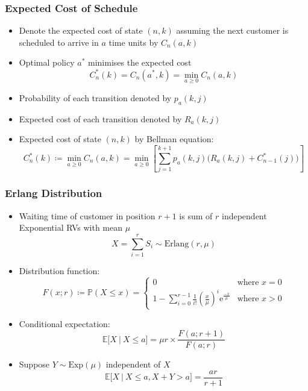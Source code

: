\documentclass{beamer}
\begin{document}
\begin{frame}
	\frametitle{Expected Cost of Schedule}

	\begin{itemize}
		\item Denote the expected cost of state $(n, k)$ assuming the next customer is scheduled to arrive in $a$ time units by $C_{n} (a, k)$
		\item Optimal policy $a^{*}$ minimises the expected cost
		\begin{equation*}
			C_{n}^{*} (k) = C_{n} (a^{*}, k) = \min_{a \geq 0} C_{n} (a, k)
		\end{equation*}
		\item Probability of each transition denoted by $p_{a} (k, j)$
		\item Expected cost of each transition denoted by $R_{a} (k, j)$
		\item Expected cost of state $(n, k)$ by \alert{Bellman equation}:
		\begin{equation*}
			C_{n}^{*} (k) \coloneqq \min_{a \geq 0} C_{n} (a, k) = \min_{a \geq 0} \left[ \sum_{j = 1}^{k + 1} p_{a} (k, j) \Big( R_{a} (k, j) + C_{n - 1}^{*} (j) \Big) \right]
		\end{equation*}
	\end{itemize}
\end{frame}

\begin{frame}
	\frametitle{Erlang Distribution}

	\begin{itemize}
		\item Waiting time of customer in position $r + 1$ is sum of $r$ independent Exponential RVs with mean $\mu$
		\begin{equation*}
		 	X = \sum_{i = 1}^{r} S_{i} \sim \text{Erlang} (r, \mu)
		\end{equation*}
		\item Distribution function:
		\begin{equation*}
			F (x; r) \coloneqq \mathbb{P} (X \leq x) = \begin{cases} 0 & \text{where $x = 0$} \\ 1 - \sum_{i = 0}^{r - 1} \frac{1}{i!} \left( \frac{x}{\mu} \right)^{i} \mathrm{e}^{\frac{-x}{\mu}} & \text{where $x > 0$} \end{cases}
		\end{equation*}
		\item Conditional expectation:
		\begin{equation*}
			\mathbb{E} \Big[ X \ \big| \ X \leq a \Big] = \mu r \times \frac{F (a; r + 1)}{F (a; r)}
		\end{equation*}
		\item Suppose $Y \sim \text{Exp} (\mu)$ independent of $X$ 
		\begin{equation*}
			\mathbb{E} \Big[ X \ \big| \ X \leq a, X + Y > a \Big] = \frac{a r}{r + 1}
		\end{equation*}
	\end{itemize}
\end{frame}
\end{document}
